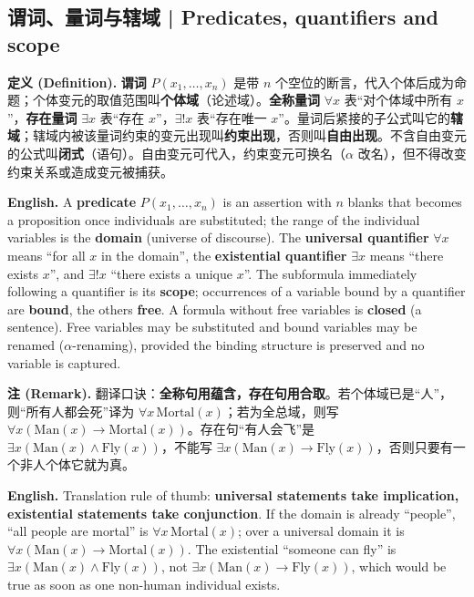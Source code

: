 \documentclass[UTF8,11pt,a4paper]{ctexart}
\newcommand{\EN}[1]{\par\noindent \textbf{English.} #1\par}
\newcommand{\DEF}[2]{\par\noindent\textbf{定义 (Definition).} #1\par\EN{#2}}
\newcommand{\REM}[2]{\par\noindent\textbf{注 (Remark).} #1\par\EN{#2}}
\begin{document}
\subsection{谓词、量词与辖域 | Predicates, quantifiers and scope}
\DEF{\textbf{谓词} $P(x_1,\dots,x_n)$ 是带 $n$ 个空位的断言，代入个体后成为命题；个体变元的取值范围叫\textbf{个体域}（论述域）。\textbf{全称量词} $\forall x$ 表“对个体域中所有 $x$”，\textbf{存在量词} $\exists x$ 表“存在 $x$”，$\exists!x$ 表“存在唯一 $x$”。量词后紧接的子公式叫它的\textbf{辖域}；辖域内被该量词约束的变元出现叫\textbf{约束出现}，否则叫\textbf{自由出现}。不含自由变元的公式叫\textbf{闭式}（语句）。自由变元可代入，约束变元可换名（$\alpha$ 改名），但不得改变约束关系或造成变元被捕获。}{A \textbf{predicate} $P(x_1,\dots,x_n)$ is an assertion with $n$ blanks that becomes a proposition once individuals are substituted; the range of the individual variables is the \textbf{domain} (universe of discourse). The \textbf{universal quantifier} $\forall x$ means ``for all $x$ in the domain'', the \textbf{existential quantifier} $\exists x$ means ``there exists $x$'', and $\exists!x$ ``there exists a unique $x$''. The subformula immediately following a quantifier is its \textbf{scope}; occurrences of a variable bound by a quantifier are \textbf{bound}, the others \textbf{free}. A formula without free variables is \textbf{closed} (a sentence). Free variables may be substituted and bound variables may be renamed ($\alpha$-renaming), provided the binding structure is preserved and no variable is captured.}
\REM{翻译口诀：\textbf{全称句用蕴含，存在句用合取}。若个体域已是“人”，则“所有人都会死”译为 $\forall x\,\mathrm{Mortal}(x)$；若为全总域，则写 $\forall x(\mathrm{Man}(x)\to\mathrm{Mortal}(x))$。存在句“有人会飞”是 $\exists x(\mathrm{Man}(x)\wedge\mathrm{Fly}(x))$，不能写 $\exists x(\mathrm{Man}(x)\to\mathrm{Fly}(x))$，否则只要有一个非人个体它就为真。}{Translation rule of thumb: \textbf{universal statements take implication, existential statements take conjunction}. If the domain is already ``people'', ``all people are mortal'' is $\forall x\,\mathrm{Mortal}(x)$; over a universal domain it is $\forall x(\mathrm{Man}(x)\to\mathrm{Mortal}(x))$. The existential ``someone can fly'' is $\exists x(\mathrm{Man}(x)\wedge\mathrm{Fly}(x))$, not $\exists x(\mathrm{Man}(x)\to\mathrm{Fly}(x))$, which would be true as soon as one non-human individual exists.}
\end{document}

